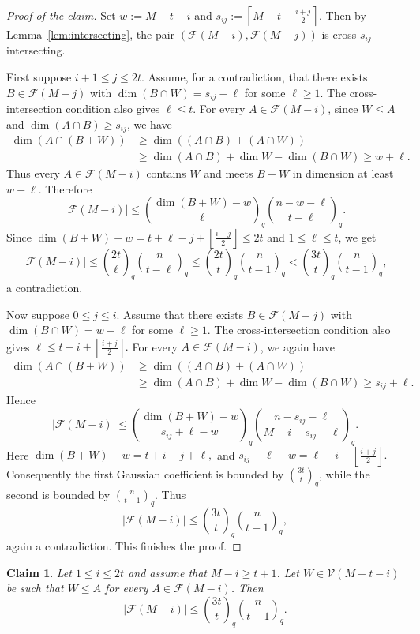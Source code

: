 \documentclass[11pt]{article}
\newtheorem{claim}[theorem]{Claim}
\theoremstyle{definition}
\newenvironment{poc}{\begin{proof}[Proof of the claim]\renewcommand*{\qedsymbol}{$\blacksquare$}}{\end{proof}}
\newcommand{\qbinom}[2]{\genfrac{(}{)}{0pt}{}{#1}{#2}_q}
\begin{document}
\begin{poc}
    Set $w:=M-t-i$ and $s_{ij}:=\left\lceil M-t-\frac{i+j}{2}\right\rceil$.
Then by Lemma~\ref{lem:intersecting}, the pair $(\mathcal F(M-i),\mathcal F(M-j))$ is cross-$s_{ij}$-intersecting.

First suppose $i+1\le j\le 2t$. 
Assume, for a contradiction, that there exists $B\in\mathcal F(M-j)$ with $\dim(B\cap W)=s_{ij}-\ell$ for some $\ell\ge 1$.
The cross-intersection condition also gives 
\(
\ell \le t.
\)
For every $A\in\mathcal F(M-i)$,
since $W\le A$ and $\dim(A\cap B)\ge s_{ij}$, we have
\begin{align*}
  \dim(A \cap (B+W))
  &\ge 
  \dim((A \cap B)+(A \cap W)) \\
  &\ge
  \dim(A\cap B)+\dim W-\dim(B\cap W)
  \ge 
  w+\ell.
\end{align*}
Thus every $A\in\mathcal F(M-i)$ contains $W$ and meets $B+W$ in dimension at least $w+\ell$. 
Therefore
\[
|\mathcal F(M-i)|
\le
\qbinom{\dim(B+W)-w}{\ell}
\qbinom{n-w-\ell}{t-\ell}.
\]
Since
\(
\dim(B+W)-w=t+\ell-j+\left\lfloor\frac{i+j}{2}\right\rfloor\le 2t
\)
and $1\le \ell\le t$, we get
\[
|\mathcal F(M-i)|
\le
\qbinom{2t}{\ell}\qbinom{n}{t-\ell}
\le
\qbinom{2t}{t}\qbinom{n}{t-1}
<
\qbinom{3t}{t}\qbinom{n}{t-1},
\]
a contradiction. 

Now suppose $0\le j\le i$. 
Assume that there exists $B\in\mathcal F(M-j)$ with $\dim(B\cap W)=w-\ell$ for some $\ell\ge 1$. 
The cross-intersection condition also gives
\(
\ell\le t-i+\left\lfloor\frac{i+j}{2}\right\rfloor.
\)
For every $A\in\mathcal F(M-i)$, we again have
\begin{align*}
  \dim(A \cap (B+W))
  &\ge 
  \dim((A \cap B)+(A \cap W)) \\
  &\ge
  \dim(A\cap B)+\dim W-\dim(B\cap W)
  \ge 
  s_{ij}+\ell.
\end{align*}
Hence
\[
|\mathcal F(M-i)|
\le
\qbinom{\dim(B+W)-w}{s_{ij}+\ell-w}
\qbinom{n-s_{ij}-\ell}{M-i-s_{ij}-\ell}.
\]
Here
\(
\dim(B+W)-w=t+i-j+\ell,
\)
and
\(
s_{ij}+\ell-w=\ell+i-\left\lfloor\frac{i+j}{2}\right\rfloor.
\)
Consequently the first Gaussian coefficient is bounded by $\qbinom{3t}{t}$, while the second is bounded by $\qbinom{n}{t-1}$. 
Thus
\[
|\mathcal F(M-i)|
\le
\qbinom{3t}{t}\qbinom{n}{t-1},
\]
again a contradiction. This finishes the proof.
\end{poc}
\begin{claim}\label{claim:typeB-trivial-layer-small}
Let $1\le i\le 2t$ and assume that $M-i\ge t+1$. 
Let $W\in\mathcal V(M-t-i)$ be such that $W\le A$ for every $A\in\mathcal F(M-i)$. 
Then
\[
|\mathcal F(M-i)|\le \qbinom{3t}{t}\qbinom{n}{t-1}.
\]
\end{claim}
\end{document}

